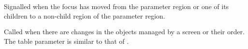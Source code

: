 \begin{function}
    \begin{funcdesc}
      Signalled when the focus has moved from the parameter region or
      one of its children to a non-child region of the parameter region.
    \end{funcdesc}
\end{function}


\begin{function}
    \begin{funcdesc}
      Called when there are changes in the objects managed by a screen
      or their order. The table parameter is similar to that of
      .
    \end{funcdesc}
\end{function}
